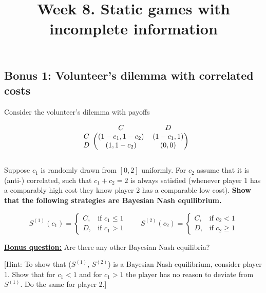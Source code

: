 \documentclass[10pt]{article}
\title{\textbf{Week 8.} Static games with incomplete information}
\date{}
\begin{document}
\maketitle


\subsection*{Bonus 1: Volunteer's dilemma with correlated costs}

Consider the volunteer's dilemma with payoffs

\begin{equation*}
    \begin{blockarray}{ccc}
        & C & D \\
        \begin{block}{c(cc)}
            C & (1 - c_1, 1 - c_2) & (1 - c_1, 1) \\
            D & (1, 1 - c_2) & (0, 0) \\
        \end{block}
    \end{blockarray}
\end{equation*}

Suppose \(c_1\) is randomly drawn from \([0, 2]\) uniformly. For \(c_2\) assume
that it is (anti-) correlated, such that \(c_1 + c_2 = 2\) is always satisfied
(whenever player 1 has a comparably high cost they know player 2 has a
comparable low cost). \textbf{Show that the following strategies are Bayesian Nash
equilibrium.}

\begin{equation*}
    S^{(1)}(c_1) = 
    \begin{cases}
        C,& \text{if } c_1 \leq 1\\
        D,              & \text{if } c_1 > 1
    \end{cases} \qquad
    S^{(2)}(c_2) = 
    \begin{cases}
        C,& \text{if } c_2 < 1\\
        D,              & \text{if } c_2 \geq 1
    \end{cases}
\end{equation*}

\underline{\textbf{Bonus question:}} Are there any other Bayesian Nash equilibria?


[Hint: To show that (\(S^{(1)}\), \(S^{(2)}\)) is a Bayesian Nash equilibrium,
consider player 1. Show that for $c_1 < 1$ and for $c_1 > 1$ the player
has no reason to deviate from \(S^{(1)}\). Do the same for player 2.]
\end{document}
